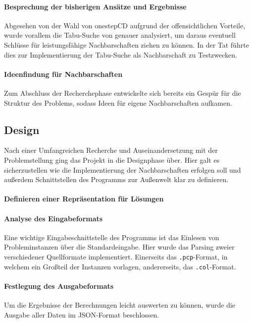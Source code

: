 \paragraph{Besprechung der bisherigen Ansätze und Ergebnisse}{Abgesehen von der Wahl von onestepCD aufgrund der offensichtlichen Vorteile, wurde vorallem die Tabu-Suche von genauer analysiert, um daraus eventuell Schlüsse für leistungsfähige Nachbarschaften ziehen zu können. In der Tat führte dies zur Implementierung der Tabu-Suche als Nachbarschaft zu Testzwecken.} %

\paragraph{Ideenfindung für Nachbarschaften}{Zum Abschluss der Recherchephase entwickelte sich bereits ein Gespür für die Struktur des Problems, sodass Ideen für eigene Nachbarschaften aufkamen.} %

\subsection{Design}

Nach einer Umfangreichen Recherche und Auseinandersetzung mit der Problemstellung ging das Projekt in die Designphase über. Hier galt es sicherzustellen wie die Implementierung der Nachbarschaften erfolgen soll und außerdem Schnittstellen des Programms zur Außenwelt klar zu definieren.

\paragraph{Definieren einer Repräsentation für Lösungen}{}
\paragraph{Analyse des Eingabeformats}{Eine wichtige Eingabeschnittstelle des Programms ist das Einlesen von Probleminstanzen über die Standardeingabe. Hier wurde das Parsing zweier verschiedener Quellformate implementiert. Einerseits das \texttt{.pcp}-Format, in welchem ein Großteil der Instanzen vorlagen, andererseits, das \texttt{.col}-Format.}
\paragraph{Festlegung des Ausgabeformats}{Um die Ergebnisse der Berechnungen leicht auswerten zu können, wurde die Ausgabe aller Daten im JSON-Format beschlossen. }
